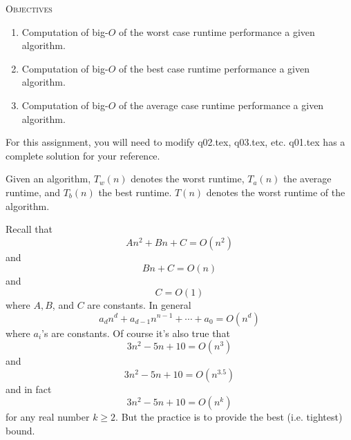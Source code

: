 


\renewcommand\TITLE{Assignment 4}

\renewcommand\SOLUTION{\textsc{Solution}}

\topmatter

\textsc{Objectives}
\begin{enumerate}[nosep]
\item Computation of big-$O$ of the worst case runtime performance
a given algorithm.
\item Computation of big-$O$ of the best case runtime performance
a given algorithm.
\item Computation of big-$O$ of the average case runtime performance
a given algorithm.
\end{enumerate}
\mbox{}


For this assignment, you will need to modify q02.tex, q03.tex, etc.
q01.tex has a complete solution for your reference.



Given an algorithm, 
$T_w(n)$ denotes the worst runtime, 
$T_a(n)$ the average runtime, and
$T_b(n)$ the best runtime.
$T(n)$ denotes the worst runtime
of the algorithm.

Recall that 
\[
An^2 + Bn + C = O(n^2)
\]
and
\[
Bn + C = O(n)
\]
and
\[
C = O(1)
\]
where $A, B$, and $C$ are constants.
In general
\[
a_dn^d + a_{d-1} n^{n-1} + \cdots + a_0 = O(n^d)
\]
where $a_i$'s are constants.
Of course it's also true that
\[
3n^2 - 5n + 10 = O(n^3)
\]
and
\[
3n^2 - 5n + 10 = O(n^{3.5})
\]
and in fact
\[
3n^2 - 5n + 10 = O(n^{k})
\]
for any real number $k \geq 2$.
But the practice is to provide the best (i.e. tightest) bound.

